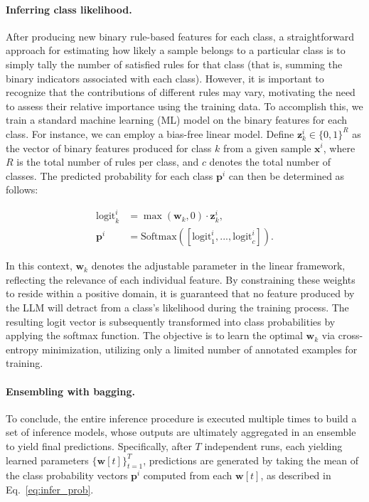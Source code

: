 \paragraph{Inferring class likelihood.} After producing new binary rule-based features for each class, a straightforward approach for estimating how likely a sample belongs to a particular class is to simply tally the number of satisfied rules for that class (that is, summing the binary indicators associated with each class). However, it is important to recognize that the contributions of different rules may vary, motivating the need to assess their relative importance using the training data. To accomplish this, we train a standard machine learning (ML) model on the binary features for each class. For instance, we can employ a bias-free linear model. Define $\mathbf{z}_k^i \in \{0, 1\}^R$ as the vector of binary features produced for class $k$ from a given sample $\mathbf{x}^i$, where $R$ is the total number of rules per class, and $c$ denotes the total number of classes. The predicted probability for each class $\mathbf{p}^i$ can then be determined as follows:

\begin{align}
\text{logit}_k^i &= \max(\mathbf{w}_k, 0) \cdot \mathbf{z}_k^i, \nonumber \\
\mathbf{p}^i &= \text{Softmax}({[\text{logit}_{1}^i, ..., \text{logit}_{c}^i]}). \label{eq:infer_prob}
\end{align}

In this context, $\mathbf{w}_k$ denotes the adjustable parameter in the linear framework, reflecting the relevance of each individual feature. By constraining these weights to reside within a positive domain, it is guaranteed that no feature produced by the LLM will detract from a class's likelihood during the training process. The resulting logit vector is subsequently transformed into class probabilities by applying the softmax function. The objective is to learn the optimal $\mathbf{w}_k$ via cross-entropy minimization, utilizing only a limited number of annotated examples for training.

\vspace*{-0.12in}
\paragraph{Ensembling with bagging.} To conclude, the entire inference procedure is executed multiple times to build a set of inference models, whose outputs are ultimately aggregated in an ensemble to yield final predictions. Specifically, after $T$ independent runs, each yielding learned parameters $\{\mathbf{w}[t]\}_{t=1}^T$, predictions are generated by taking the mean of the class probability vectors $\mathbf{p}^i$ computed from each $\mathbf{w}[t]$, as described in Eq.~\ref{eq:infer_prob}.

